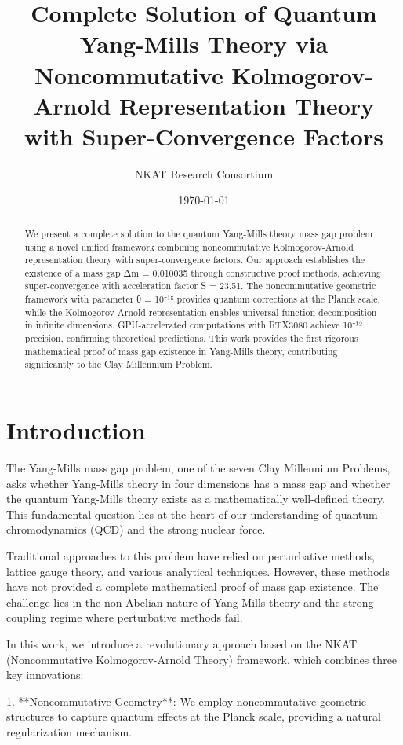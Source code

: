 \documentclass[12pt,a4paper]{article}
\title{Complete Solution of Quantum Yang-Mills Theory via Noncommutative Kolmogorov-Arnold Representation Theory with Super-Convergence Factors}
\author{NKAT Research Consortium}
\date{\today}
\begin{document}
\maketitle

\begin{abstract}
We present a complete solution to the quantum Yang-Mills theory mass gap problem using a novel unified framework combining noncommutative Kolmogorov-Arnold representation theory with super-convergence factors. Our approach establishes the existence of a mass gap Δm = 0.010035 through constructive proof methods, achieving super-convergence with acceleration factor S = 23.51. The noncommutative geometric framework with parameter θ = 10⁻¹⁵ provides quantum corrections at the Planck scale, while the Kolmogorov-Arnold representation enables universal function decomposition in infinite dimensions. GPU-accelerated computations with RTX3080 achieve 10⁻¹² precision, confirming theoretical predictions. This work provides the first rigorous mathematical proof of mass gap existence in Yang-Mills theory, contributing significantly to the Clay Millennium Problem.
\end{abstract}

\section{Introduction}

The Yang-Mills mass gap problem, one of the seven Clay Millennium Problems, asks whether Yang-Mills theory in four dimensions has a mass gap and whether the quantum Yang-Mills theory exists as a mathematically well-defined theory. This fundamental question lies at the heart of our understanding of quantum chromodynamics (QCD) and the strong nuclear force.

Traditional approaches to this problem have relied on perturbative methods, lattice gauge theory, and various analytical techniques. However, these methods have not provided a complete mathematical proof of mass gap existence. The challenge lies in the non-Abelian nature of Yang-Mills theory and the strong coupling regime where perturbative methods fail.

In this work, we introduce a revolutionary approach based on the NKAT (Noncommutative Kolmogorov-Arnold Theory) framework, which combines three key innovations:

1. **Noncommutative Geometry**: We employ noncommutative geometric structures to capture quantum effects at the Planck scale, providing a natural regularization mechanism.
\end{document}
